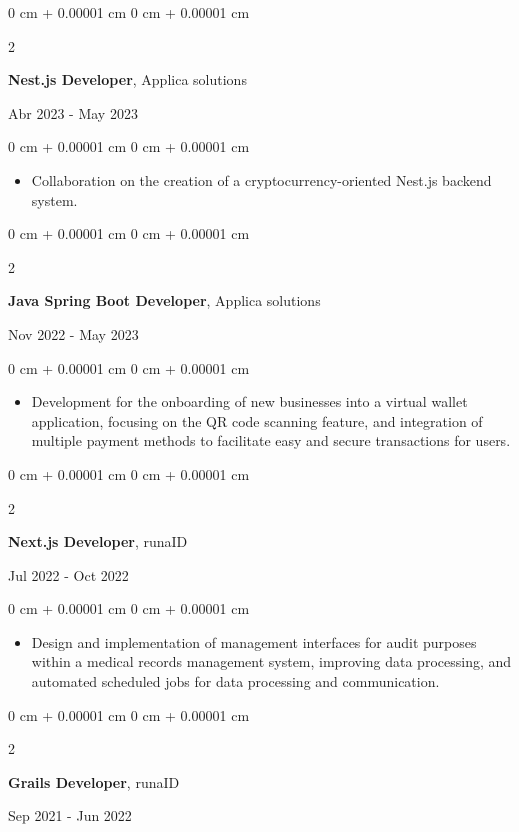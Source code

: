 \documentclass[10pt, letterpaper]{article}
\newenvironment{highlights}{
    \begin{itemize}[
        topsep=0.10 cm,
        parsep=0.10 cm,
        partopsep=0pt,
        itemsep=0pt,
        leftmargin=0 cm + 10pt
    ]
}{
    \end{itemize}
} %
\newenvironment{onecolentry}{
    \begin{adjustwidth}{
        0 cm + 0.00001 cm
    }{
        0 cm + 0.00001 cm
    }
}{
    \end{adjustwidth}
} %
\newenvironment{twocolentry}[2][]{
    \onecolentry
    \def\secondColumn{#2}
    \setcolumnwidth{\fill, 4.5 cm}
    \begin{paracol}{2}
}{
    \switchcolumn \raggedleft \secondColumn
    \end{paracol}
    \endonecolentry
} %
\begin{document}
    \vspace{0.2 cm}  
    \begin{twocolentry}{
            Abr 2023  - May 2023
        }
    \textbf{Nest.js Developer}, Applica solutions
    \end{twocolentry}   
    \vspace{0.10 cm}
    \begin{onecolentry}
        \begin{highlights}
            \item Collaboration on the creation of a cryptocurrency-oriented Nest.js backend system.
        \end{highlights}
    \end{onecolentry}
    \vspace{0.10 cm}
    \begin{twocolentry}{
            Nov 2022  - May 2023
        }
    \textbf{Java Spring Boot Developer}, Applica solutions
    \end{twocolentry}   
    \vspace{0.10 cm}
    \begin{onecolentry}
        \begin{highlights}
            \item Development for the onboarding of new businesses into a virtual wallet application, focusing on the QR code scanning feature, and integration of multiple payment methods to facilitate easy and secure transactions for users.
        \end{highlights}
    \end{onecolentry}
    \vspace{0.2 cm}
    \begin{twocolentry}{
            Jul 2022  - Oct 2022
        }
        \textbf{Next.js Developer}, runaID
    \end{twocolentry}
    \vspace{0.10 cm}
    \begin{onecolentry}
        \begin{highlights}
            \item Design and implementation of management interfaces for audit purposes within a medical records management system, improving data processing, and automated scheduled jobs for data processing and communication.
        \end{highlights}
    \end{onecolentry}
    \vspace{0.2 cm}
    \begin{twocolentry}{
            Sep 2021  - Jun 2022
        }
        \textbf{Grails Developer}, runaID
    \end{twocolentry}
\end{document}
